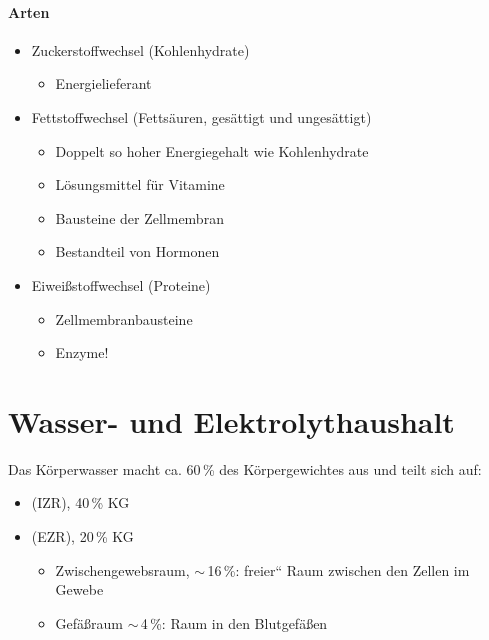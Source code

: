 \paragraph{Arten}

\begin{itemize}
    \item Zuckerstoffwechsel (Kohlenhydrate)
    \begin{itemize}
        \item Energielieferant
    \end{itemize}
    \item Fettstoffwechsel (Fetts\"auren, ges\"attigt und  unges\"attigt)
    \begin{itemize}
        \item Doppelt so hoher Energiegehalt wie  Kohlenhydrate
        \item L\"osungsmittel f\"ur Vitamine
        \item Bausteine der Zellmembran
        \item Bestandteil von Hormonen
    \end{itemize}
    \item Eiwei{\ss}stoffwechsel (Proteine)
    \begin{itemize}
        \item Zellmembranbausteine
        \item Enzyme!
    \end{itemize}
\end{itemize}

\section{Wasser- und Elektro\-lyt\-haus\-halt}
Das K\"orperwasser macht ca. 60\,\% des K\"orpergewichtes
aus und teilt sich auf:

\begin{itemize}
\item {} (IZR), 40\,\% KG 
\item {} (EZR), 20\,\% KG 
\begin{itemize}
\item {}Zwischengewebsraum,
$\sim$\,16\,\%: {\quotedblbase}freier{\textquotedblleft}
Raum zwischen den Zellen im Gewebe
\item {}Gef\"a{\ss}raum $\sim$\,4\,\%:
Raum in den Blutgef\"a{\ss}en
\end{itemize}
\end{itemize}

